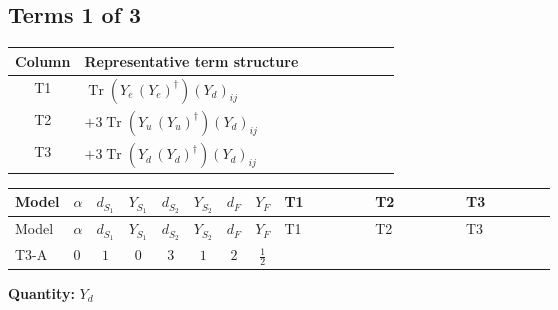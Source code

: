 \documentclass[8pt]{article}
\begin{document}
\begin{landscape}
\subsection*{Terms 1 of 3}
\begin{center}
\begin{tabular}{@{}c >{\raggedright\arraybackslash}p{0.82\linewidth}@{}}
\toprule
Column & Representative term structure \\
\midrule
T1 & \(\displaystyle \operatorname{Tr}\!\left({Y_e}\,\left({Y_e}\right)^{\dagger}\right) \left({Y_d}\right)_{ij}\) \\
\midrule
T2 & \(\displaystyle +3 \operatorname{Tr}\!\left({Y_u}\,\left({Y_u}\right)^{\dagger}\right) \left({Y_d}\right)_{ij}\) \\
\midrule
T3 & \(\displaystyle +3 \operatorname{Tr}\!\left({Y_d}\,\left({Y_d}\right)^{\dagger}\right) \left({Y_d}\right)_{ij}\) \\
\midrule
\bottomrule
\end{tabular}
\end{center}
\smallskip
\tiny
\begin{longtable}{@{}llcccccc >{\raggedright\arraybackslash}p{0.21\linewidth} >{\raggedright\arraybackslash}p{0.21\linewidth} >{\raggedright\arraybackslash}p{0.21\linewidth}@{}}
\toprule
Model & $\alpha$ & $d_{S_1}$ & $Y_{S_1}$ & $d_{S_2}$ & $Y_{S_2}$ & $d_F$ & $Y_F$ & T1 & T2 & T3 \\
\midrule
\endfirsthead
\toprule
Model & $\alpha$ & $d_{S_1}$ & $Y_{S_1}$ & $d_{S_2}$ & $Y_{S_2}$ & $d_F$ & $Y_F$ & T1 & T2 & T3 \\
\midrule
\endhead
T3-A & $0$ & $1$ & $0$ & $3$ & $1$ & $2$ & $\frac{1}{2}$ & \scriptsize\adjustbox{max width=\linewidth}{$\begin{gathered} \operatorname{Tr}\!\left({Y_e}\,\left({Y_e}\right)^{\dagger}\right) \left({Y_d}\right)_{ij}\end{gathered}$} & \scriptsize\adjustbox{max width=\linewidth}{$\begin{gathered} +3 \operatorname{Tr}\!\left({Y_u}\,\left({Y_u}\right)^{\dagger}\right) \left({Y_d}\right)_{ij}\end{gathered}$} & \scriptsize\adjustbox{max width=\linewidth}{$\begin{gathered} +3 \operatorname{Tr}\!\left({Y_d}\,\left({Y_d}\right)^{\dagger}\right) \left({Y_d}\right)_{ij}\end{gathered}$} \\
\midrule
\bottomrule
\end{longtable}
\clearpage
\noindent\textbf{Quantity: }$Y_d$\par\smallskip

\end{landscape}
\end{document}
